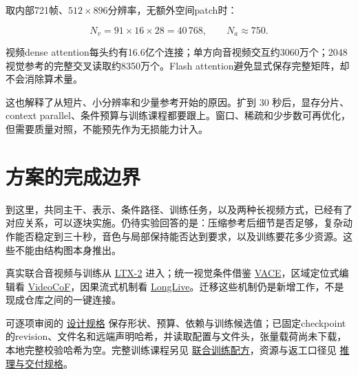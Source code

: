取内部721帧、\(512\times896\)分辨率，无额外空间patch时：

\[
N_v=91\times16\times28=40\,768,\qquad N_a\approx750.
\]

视频dense attention每头约有16.6亿个连接；单方向音视频交互约3060万个；2048视觉参考的完整交叉读取约8350万个。Flash attention避免显式保存完整矩阵，却不会消除算术量。

这也解释了从短片、小分辨率和少量参考开始的原因。扩到 30 秒后，显存分片、context parallel、条件预算与训练课程都要跟上。窗口、稀疏和少步数可再优化，但需要质量对照，不能预先作为无损能力计入。

\section{方案的完成边界}\label{seedance-m19-ux65b9ux6848ux7684ux5b8cux6210ux8fb9ux754c}

到这里，共同主干、表示、条件路径、训练任务，以及两种长视频方式，已经有了对应关系，可以逐块实施。仍待实验回答的是：压缩参考后细节是否足够，复杂动作能否稳定到三十秒，音色与局部保持能否达到要求，以及训练要花多少资源。这些不能由结构图本身推出。

真实联合音视频与训练从 \href{https://github.com/Lightricks/LTX-2}{LTX-2} 进入；统一视觉条件借鉴 \href{https://github.com/ali-vilab/VACE}{VACE}，区域定位式编辑看 \href{https://github.com/knightyxp/VideoCoF}{VideoCoF}，因果流式机制看 \href{https://github.com/NVlabs/LongLive}{LongLive}。迁移这些机制仍是新增工作，不是现成仓库之间的一键连接。

可逐项审阅的 \href{https://github.com/foocker/multimodal-journey/blob/0f1b6bb86d609d75d8c2582063d85707d0180d39/topics/video-generation/seedance-2.5/design-spec.json}{设计规格} 保存形状、预算、依赖与训练候选值；已固定checkpoint的revision、文件名和远端声明哈希，并读取配置与文件头，张量载荷尚未下载，本地完整校验哈希为空。完整训练课程另见 \hyperref[seedance-m20]{联合训练配方}，资源与返工口径见 \hyperref[seedance-m26]{推理与交付规格}。
